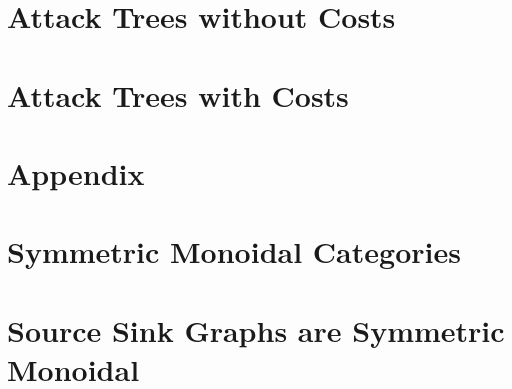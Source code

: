 \documentclass{llncs}
\begin{document}
\section{Attack Trees without Costs}
\label{sec:attack_trees_without_costs}


\section{Attack Trees with Costs}
\label{sec:attack_trees_with_costs}





\appendix

\section*{Appendix}
\label{sec:appendix}
\section{Symmetric Monoidal Categories}
\label{sec:symmetric_monoidal_categories}


\section{Source Sink Graphs are Symmetric Monoidal}
\label{sec:source_sink_graphs_are_symmetric_monoidal}

\end{document}
